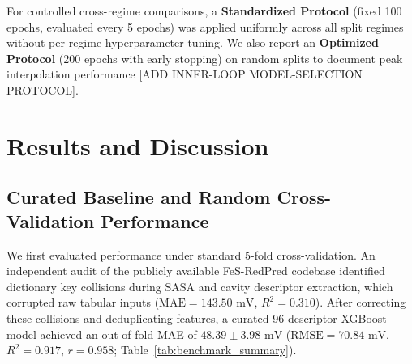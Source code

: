 \documentclass[journal=jcisd8,manuscript=article]{achemso}
\begin{document}
For controlled cross-regime comparisons, a \textbf{Standardized Protocol} (fixed 100 epochs, evaluated every 5 epochs) was applied uniformly across all split regimes without per-regime hyperparameter tuning. We also report an \textbf{Optimized Protocol} (200 epochs with early stopping) on random splits to document peak interpolation performance [ADD INNER-LOOP MODEL-SELECTION PROTOCOL].

\section{Results and Discussion}

\subsection{Curated Baseline and Random Cross-Validation Performance}
We first evaluated performance under standard 5-fold cross-validation. An independent audit of the publicly available FeS-RedPred codebase\cite{persico2025predicting} identified dictionary key collisions during SASA and cavity descriptor extraction, which corrupted raw tabular inputs ($\text{MAE} = 143.50\text{ mV}$, $R^2 = 0.310$). After correcting these collisions and deduplicating features, a curated 96-descriptor XGBoost model achieved an out-of-fold MAE of $48.39 \pm 3.98\text{ mV}$ ($\text{RMSE} = 70.84\text{ mV}$, $R^2 = 0.917$, $r = 0.958$; Table~\ref{tab:benchmark_summary}).
\end{document}
